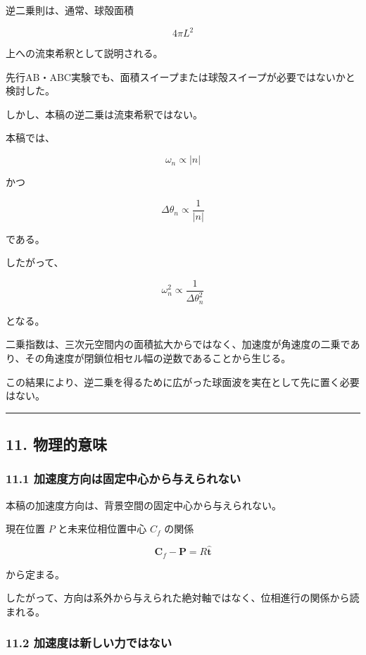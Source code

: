 \documentclass[
  10pt,
  a4paper,
]{ltjsarticle}
\begin{document}
逆二乗則は、通常、球殻面積

\[
4\pi L^2
\]

上への流束希釈として説明される。

先行AB・ABC実験でも、面積スイープまたは球殻スイープが必要ではないかと検討した。

しかし、本稿の逆二乗は流束希釈ではない。

本稿では、

\[
\omega_n\propto|n|
\]

かつ

\[
\Delta\theta_n\propto\frac{1}{|n|}
\]

である。

したがって、

\[
\omega_n^2
\propto
\frac{1}{\Delta\theta_n^2}
\]

となる。

二乗指数は、三次元空間内の面積拡大からではなく、加速度が角速度の二乗であり、その角速度が閉鎖位相セル幅の逆数であることから生じる。

この結果により、逆二乗を得るために広がった球面波を実在として先に置く必要はない。

\begin{center}\rule{0.5\linewidth}{0.5pt}\end{center}

\subsection{11. 物理的意味}\label{ux7269ux7406ux7684ux610fux5473}

\subsubsection{11.1
加速度方向は固定中心から与えられない}\label{ux52a0ux901fux5ea6ux65b9ux5411ux306fux56faux5b9aux4e2dux5fc3ux304bux3089ux4e0eux3048ux3089ux308cux306aux3044}

本稿の加速度方向は、背景空間の固定中心から与えられない。

現在位置 \(P\) と未来位相位置中心 \(C_f\) の関係

\[
\boldsymbol C_f-\boldsymbol P
=R\hat{\boldsymbol t}
\]

から定まる。

したがって、方向は系外から与えられた絶対軸ではなく、位相進行の関係から読まれる。

\subsubsection{11.2
加速度は新しい力ではない}\label{ux52a0ux901fux5ea6ux306fux65b0ux3057ux3044ux529bux3067ux306fux306aux3044}
\end{document}
